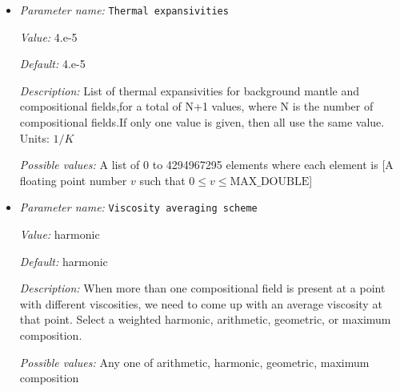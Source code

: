 \begin{itemize}
{\it Value:} 4.7


{\it Default:} 4.7


{\it Description:} List of thermal conductivities for background mantle and compositional fields,for a total of N+1 values, where N is the number of compositional fields.If only one value is given, then all use the same value. Units: $W/m/K$.


{\it Possible values:} A list of 0 to 4294967295 elements where each element is [A floating point number $v$ such that $0 \leq v \leq \text{MAX\_DOUBLE}$]
\item {\it Parameter name:} {\tt Thermal expansivities}
\label{parameters:Material model/Dynamic Friction/Thermal expansivities}
\label{parameters:Material_20model/Dynamic_20Friction/Thermal_20expansivities}


{\it Value:} 4.e-5


{\it Default:} 4.e-5


{\it Description:} List of thermal expansivities for background mantle and compositional fields,for a total of N+1 values, where N is the number of compositional fields.If only one value is given, then all use the same value. Units: $1/K$


{\it Possible values:} A list of 0 to 4294967295 elements where each element is [A floating point number $v$ such that $0 \leq v \leq \text{MAX\_DOUBLE}$]
\item {\it Parameter name:} {\tt Viscosity averaging scheme}
\label{parameters:Material model/Dynamic Friction/Viscosity averaging scheme}
\label{parameters:Material_20model/Dynamic_20Friction/Viscosity_20averaging_20scheme}


{\it Value:} harmonic


{\it Default:} harmonic


{\it Description:} When more than one compositional field is present at a point with different viscosities, we need to come up with an average viscosity at that point.  Select a weighted harmonic, arithmetic, geometric, or maximum composition.


{\it Possible values:} Any one of arithmetic, harmonic, geometric, maximum composition
\end{itemize}



